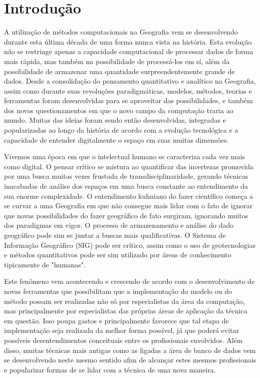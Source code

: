 \chapter{Introdução}
A utilização de métodos computacionais na Geografia vem se desenvolvendo durante esta última década de uma forma nunca vista na história. Esta evolução não se restringe apenas a capacidade computacional de processar dados de forma mais rápida, mas também na possibilidade de processá-los em sí, além da possibilidade de armazenar uma quantidade surpreendentemente grande de dados. Desde a consolidação do pensamento quantitativo e analítico na Geografia, assim como durante suas revoluções paradigmáticas, modelos, métodos, teorias e ferramentas foram desenvolvidas para se aproveitar das possibilidades, e também dos novos questionamentos em que o novo campo da computação traria ao mundo. Muitas das ideias foram sendo então desenvolvidas, integradas e popularizadas ao longo da história de acordo com a evolução tecnológica e a capacidade de entender digitalmente o espaço em suas muitas dimensões. \par
Vivemos uma época em que o intelectual humano se caracteriza cada vez mais como digital. O pensar crítico se mistura ao quantificar das incertezas promovida por uma busca  muitas vezes frustada de transdisciplinaridade, gerando técnicas inacabadas de análise dos espaços em uma busca constante ao entendimento da sua enorme complexidade. O entendimento kuhniano do fazer científico começa a se curvar a uma Geografia em que não consegue mais lidar com o fato de ignorar que novas possibilidades do fazer geográfico de fato surgiram, ignorando muitos dos paradigmas em vigor. O processo de armazenamento e análise do dado geográfico pode sim se juntar a buscas mais qualificativas. O Sistema de Informação Geográfico (SIG) pode ser crítico, assim como o uso de geotecnologias e métodos quantitativos pode ser sim utilizado por áreas de conhecimento tipicamente de "humanas". \par
Este fenômeno vem acontecendo e crescendo de acordo com o desenvolvimento de novas ferramentas que possibilitam que a implementação do modelo ou do método possam ser realizadas não só por especialistas da área da computação, mas principalmente por especialistas das próprias áreas de aplicação da técnica em questão. Isso poupa gastos e principalmente favorece que tal etapa de implementação seja realizada da melhor forma possível, já que poderá evitar possíveis desentendimentos conceituais entre os profissionais envolvidos. Além disso, muitas técnicas mais antigas como as ligadas a área de banco de dados vem se desenvolvendo neste mesmo sentido afim de alcançar estes mesmos profissionais e popularizar formas de se lidar com a técnica de uma nova maneira. \par
